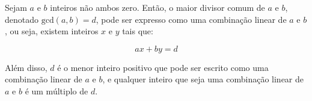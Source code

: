 \begin{theorem}\label{thm:bezout}

  Sejam $a$ e $b$ inteiros não ambos zero. Então, o maior divisor comum de $a$
  e $b$, denotado $\text{gcd}(a, b) = d$, pode ser expresso como uma combinação
  linear de $a$ e $b$, ou seja, existem inteiros $x$ e $y$ tais que:

  \begin{equation}
  ax + by = d
  \end{equation}

  Além disso, $d$ é o menor inteiro positivo que pode ser escrito como uma
  combinação linear de $a$ e $b$, e qualquer inteiro que seja uma
  combinação linear de $a$ e $b$ é um múltiplo de $d$.
\end{theorem}

